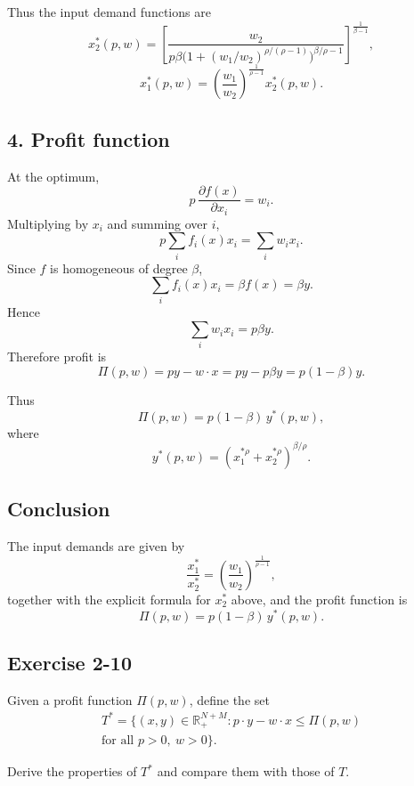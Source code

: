 Thus the input demand functions are
\[
\boxed{
x_2^*(p,w)
=
\left[
\frac{w_2}{p\beta \bigl(1+(w_1/w_2)^{\rho/(\rho-1)}\bigr)^{\beta/\rho-1}}
\right]^{\frac{1}{\beta-1}},
}
\]
\[
\boxed{
x_1^*(p,w)
=
\left(\frac{w_1}{w_2}\right)^{\frac{1}{\rho-1}} x_2^*(p,w).
}
\]

\subsection*{4. Profit function}

At the optimum,
\[
p\,\frac{\partial f(x)}{\partial x_i}=w_i.
\]
Multiplying by \(x_i\) and summing over \(i\),
\[
p\sum_i f_i(x)x_i=\sum_i w_ix_i.
\]
Since \(f\) is homogeneous of degree \(\beta\),
\[
\sum_i f_i(x)x_i=\beta f(x)=\beta y.
\]
Hence
\[
\sum_i w_ix_i=p\beta y.
\]
Therefore profit is
\[
\Pi(p,w)=py-w\cdot x=p y-p\beta y=p(1-\beta)y.
\]

Thus
\[
\boxed{
\Pi(p,w)=p(1-\beta)\,y^*(p,w),
}
\]
where
\[
y^*(p,w)=\left(x_1^{*\rho}+x_2^{*\rho}\right)^{\beta/\rho}.
\]

\subsection*{Conclusion}

The input demands are given by
\[
\boxed{
\frac{x_1^*}{x_2^*}
=
\left(\frac{w_1}{w_2}\right)^{\frac{1}{\rho-1}},
}
\]
together with the explicit formula for \(x_2^*\) above, and the profit function is
\[
\boxed{
\Pi(p,w)=p(1-\beta)\,y^*(p,w).
}
\]



\vspace{30pt}
\begin{tcolorbox}[breakable]

\subsection*{Exercise 2-10}

Given a profit function $\Pi(p,w)$, define the set
\[
\begin{aligned}
T^*
=
\{(x,y)\in \mathbb{R}_+^{N+M} : p\cdot y - w\cdot x \le \Pi(p,w)\\
\text{for all } p>0,\ w>0\}.
\end{aligned}
\]

Derive the properties of $T^*$ and compare them with those of $T$.

\end{tcolorbox}

